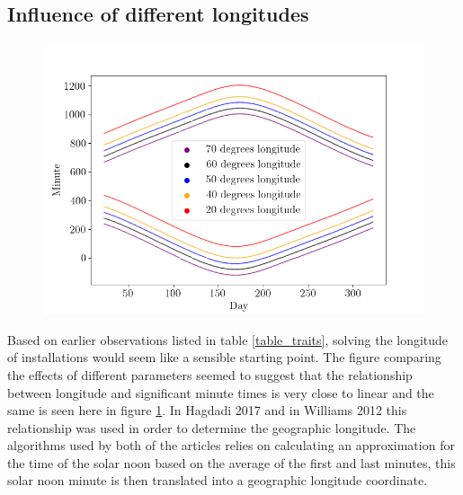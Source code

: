 


\newpage

\subsection{Influence of different longitudes}
\label{section_different_longitudes}

\begin{figure}[ht!]
\centering
\includegraphics[width=1\linewidth]{pics/poa_var_lon}
\label{fig-poa_var_lon2}
\end{figure}

\noindent Based on earlier observations listed in table \ref{table_traits}, solving the longitude of installations would seem like a sensible starting point. The figure comparing the effects of different parameters seemed to suggest that the relationship between longitude and significant minute times is very close to linear and the same is seen here in figure \ref{fig-poa_var_lon2}. In Hagdadi 2017 \cite{navid_australian_article} and in Williams 2012 \cite{older_solar_solver_article} this relationship was used in order to determine the geographic longitude. The algorithms used by both of the articles relies on calculating an approximation for the time of the solar noon based on the average of the first and last minutes, this solar noon minute is then translated into a geographic longitude coordinate.





